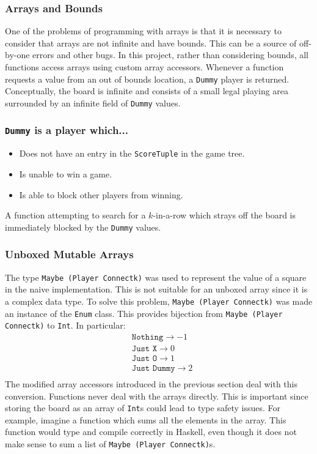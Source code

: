 \subsubsection{Arrays and Bounds} 
One of the problems of programming with arrays is that it is necessary to consider that arrays are not infinite and have bounds. This can be a source of off-by-one errors and other bugs. In this project, rather than considering bounds, all functions access arrays using custom array accessors. Whenever a function requests a value from an out of bounds location, a \texttt{Dummy} player is returned. Conceptually, the board is infinite and consists of a small legal playing area surrounded by an infinite field of \texttt{Dummy} values. \subsubsection{\texttt{Dummy} is a player which...}
\begin{itemize}
\item[] Does not have an entry in the \texttt{ScoreTuple} in the game tree.
\item[] Is unable to win a game.
\item[] Is able to block other players from winning. 
\end{itemize}
A function attempting to search for a $k$-in-a-row which strays off the board is immediately blocked by the \texttt{Dummy} values.
\subsubsection{Unboxed Mutable Arrays} 
The type \texttt{Maybe (Player Connectk)} was used to represent the value of a square in the {naive implementation}. This is not suitable for an {unboxed} array since it is a complex data type. To solve this problem,  \texttt{Maybe (Player Connectk)} was made an instance of the \texttt{Enum} class. This provides bijection from \texttt{Maybe (Player Connectk)} to \texttt{Int}. In particular:
\begin{equation}
\begin{split}
&\texttt{Nothing}\rightarrow -1\\
&\texttt{Just X}\rightarrow 0  \\
&\texttt{Just O}\rightarrow 1  \\
&\texttt{Just Dummy}\rightarrow 2 \\
\end{split}
\nonumber
\end{equation}
The modified array accessors introduced in the previous section deal with this conversion. Functions never deal with the arrays directly. This is important since storing the board as an array of \texttt{Int}s could lead to type safety issues. For example, imagine a function which sums all the elements in the array. This function would type and compile correctly in {Haskell}, even though it does not make sense to sum a list of \texttt{Maybe (Player Connectk)}s.
